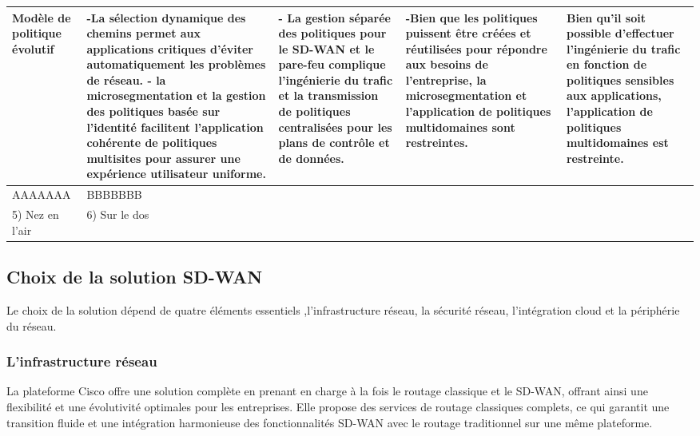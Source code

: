 \begin{table}[H]
	\begin{center}
		
		\hspace*{-0.5 cm}	\begin{tabular}{|p{3cm}|p{3cm}|p{3cm}|p{3cm}|p{3cm}|}
			\hline
			\centering
			\centering
			Modèle de politique évolutif & -La sélection dynamique des chemins permet aux applications critiques d'éviter automatiquement les problèmes de réseau.
			- la microsegmentation et la gestion des politiques basée sur l'identité facilitent l'application cohérente de politiques multisites pour assurer une expérience utilisateur uniforme.& - La gestion séparée des politiques pour le SD-WAN et le pare-feu complique l'ingénierie du trafic et la transmission de politiques centralisées pour les plans de contrôle et de données.& -Bien que les politiques puissent être créées et réutilisées pour répondre aux besoins de l'entreprise, la microsegmentation et l'application de politiques multidomaines sont restreintes.& Bien qu'il soit possible d'effectuer l'ingénierie du trafic en fonction de politiques sensibles aux applications, l'application de politiques multidomaines est restreinte.
			\\
			\hline
			
			
			\centering
			AAAAAAA &BBBBBBB\\
			\hline
			\centering
			
			5) Nez en l’air &   6) Sur le dos \\
			\hline
		\end{tabular}
	\end{center}
\end{table}	


\subsection{Choix de la solution SD-WAN  }
Le choix de la solution dépend de quatre éléments essentiels ,l'infrastructure réseau, la sécurité réseau, l'intégration cloud et la périphérie du réseau.
\subsubsection{L'infrastructure réseau }

La plateforme Cisco offre une solution complète en prenant en charge à la fois le routage classique et le SD-WAN, offrant ainsi une flexibilité et une évolutivité optimales pour les entreprises. Elle propose des services de routage classiques complets, ce qui garantit une transition fluide et une intégration harmonieuse des fonctionnalités SD-WAN avec le routage traditionnel sur une même plateforme. 

